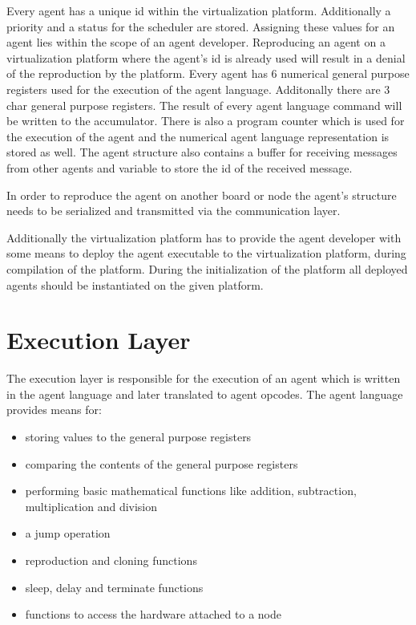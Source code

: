 \documentclass{scrreprt}
\begin{document}
Every agent has a unique id within the virtualization platform. Additionally a priority and a status for the
scheduler are stored. Assigning these values for an agent lies within the scope of an agent developer. 
Reproducing an agent on a virtualization platform where the agent’s id is already used will result in a denial 
of the reproduction by the platform. Every agent has 6 numerical general purpose registers used for the execution
of the agent language. Additonally there are 3 char general purpose registers. The result of every agent language 
command will be written to the accumulator. There is also a program counter which is used for the execution of the
agent and the numerical agent language representation is stored as well. The agent structure also contains a buffer
for receiving messages from other agents and variable to store the id of the received message.


\noindent
In order to reproduce the agent on another board or node the agent’s structure needs to be serialized and transmitted via the communication layer.


\noindent
Additionally the virtualization platform has to provide the agent developer with some means to deploy the agent
executable to the virtualization platform, during compilation of the platform. During the initialization of the
platform all deployed agents should be instantiated on the given platform.

\section{Execution Layer}

The execution layer is responsible for the execution of an agent which is written in the agent language and later translated to agent opcodes. 
The agent language provides means for:
\begin{itemize}
 \item storing values to the general purpose registers
 \item comparing the contents of the general purpose registers 
 \item performing basic mathematical functions like addition, subtraction, multiplication and division
 \item a jump operation 
 \item reproduction and cloning functions
 \item sleep, delay and terminate functions
 \item functions to access the hardware attached to a node
\end{itemize}
\end{document}

